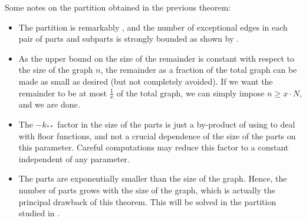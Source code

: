         \begin{remark}
            Some notes on the partition obtained in the previous theorem:
            \begin{itemize}
                \item The partition is remarkably \regular, and the number of exceptional edges in each pair of parts
                    and subparts is strongly bounded as shown by .
                \item As the upper bound on the size of the remainder is constant with respect to the size of the graph $n$,
                    the remainder as a fraction of the total graph can be made as small as desired (but not completely avoided).
                    If we want the remainder to be at most $\frac{1}{x}$ of the total graph, we can simply impose
                    $n \geq x \cdot N$, and we are done.
                \item The $- k_{**}$ factor in the size of the parts is just a by-product of using 
                    to deal with floor functions, and not a crucial dependence of the size of the parts
                    on this parameter.
                    Careful computations may reduce this factor to a constant independent of any parameter.
                \item The parts are exponentially smaller than the size of the graph.
                    Hence, the number of parts grows with the size of the graph, which is actually the principal drawback of
                    this theorem.
                    This will be solved in the partition studied in .
            \end{itemize}
        \end{remark}

